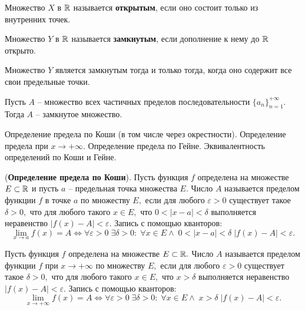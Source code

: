 \begin{definition}
	Множество $X$ в $\mathbb{R}$ называется \textbf{открытым},
	если оно состоит только из внутренних
	точек.

	Множество $Y$ в $\mathbb{R}$ называется \textbf{замкнутым},
	если дополнение к нему до $\mathbb{R}$ открыто.
\end{definition}

\begin{lemma}
	Множество $Y$ является замкнутым тогда
	и только тогда, когда оно содержит
	все свои предельные точки.
\end{lemma}


\begin{lemma}
	Пусть $A$ -- множество всех частичных
	пределов последовательности
	$\{a_n\}_{n=1}^{+\infty}.$ Тогда
	$A$ -- замкнутое множество.
\end{lemma}
\newpage
\begin{problem}
Определение предела по Коши (в том числе через окрестности). Определение предела
при $x \to +\infty$. Определение предела по Гейне. Эквивалентность определений по Коши и
Гейне.
\end{problem}

\begin{definition}
	(\textbf{Определение предела по Коши}).
	Пусть функция $f$ определена на множестве
	$E\subset\mathbb{R}$ и пусть $a$ -- предельная
	точка множества $E.$ Число $A$ называется
	пределом функции $f$ в точке $a$ по множеству
	$E,$ если для любого $\varepsilon>0$
	существует такое $\delta>0,$ что
	для любого такого $x\in E,$ что
	$0<|x-a|<\delta$
	выполняется неравенство $|f(x)-A|<\varepsilon.$
	Запись с помощью кванторов:
	$$
		\lim\limits_{x\rightarrow a}f(x)=A\Leftrightarrow
		\forall\varepsilon>0\;\exists\delta>0:\;
		\forall x \in E\wedge\;0<|x-a|<\delta\;
		|f(x)-A|<\varepsilon.
	$$
\end{definition}

\begin{definition}
	Пусть функция $f$ определена на множестве
	$E\subset\mathbb{R}.$ Число $A$ называется
	пределом функции $f$ при
	$x\rightarrow+\infty$ по множеству
	$E,$ если для любого $\varepsilon>0$
	существует такое $\delta>0,$ что
	для любого такого $x\in E,$ что
	$x>\delta$
	выполняется неравенство $|f(x)-A|<\varepsilon.$
	Запись с помощью кванторов:
	$$
		\lim\limits_{x\rightarrow +\infty}f(x)=A\Leftrightarrow
		\forall\varepsilon>0\;\exists\delta>0:\;
		\forall x \in E\wedge\;x>\delta\;
		|f(x)-A|<\varepsilon.
	$$
\end{definition}

